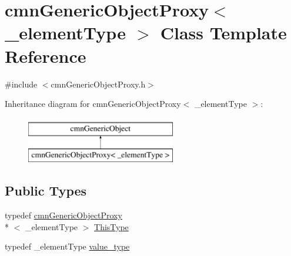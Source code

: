 \hypertarget{classcmn_generic_object_proxy}{\section{cmn\-Generic\-Object\-Proxy$<$ \-\_\-element\-Type $>$ Class Template Reference}
\label{classcmn_generic_object_proxy}
}


{\ttfamily \#include $<$cmn\-Generic\-Object\-Proxy.\-h$>$}

Inheritance diagram for cmn\-Generic\-Object\-Proxy$<$ \-\_\-element\-Type $>$\-:\begin{figure}[H]
\begin{center}
\leavevmode
\includegraphics[height=2.000000cm]{d1/de4/classcmn_generic_object_proxy}
\end{center}
\end{figure}
\subsection*{Public Types}
\begin{DoxyCompactItemize}
\item 
typedef \hyperlink{classcmn_generic_object_proxy}{cmn\-Generic\-Object\-Proxy}\\*
$<$ \-\_\-element\-Type $>$ \hyperlink{classcmn_generic_object_proxy_a4ad0391ca48ebfb86d6bbda89a98c99d}{This\-Type}
\item 
typedef \-\_\-element\-Type \hyperlink{classcmn_generic_object_proxy_a5a3db96e5acd73055d5d34c25c1635f3}{value\-\_\-type}
\end{DoxyCompactItemize}

